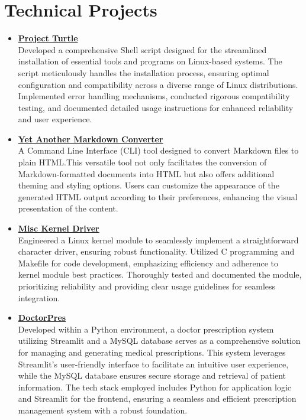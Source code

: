 \documentclass[a4paper,10pt]{article}
\begin{document}
\section*{Technical Projects}
\begin{itemize}[leftmargin=*]
   \item \textbf{\href{https://github.com/Adarsh-Liju/ProjectTurtle}{Project Turtle}} \\
        Developed a comprehensive Shell script designed for the streamlined installation of essential tools and programs on Linux-based systems. The script meticulously handles the installation process, ensuring optimal configuration and compatibility across a diverse range of Linux distributions. Implemented error handling mechanisms, conducted rigorous compatibility testing, and documented detailed usage instructions for enhanced reliability and user experience.
   \item \textbf{\href{https://github.com/Adarsh-Liju/yamc}{Yet Another Markdown Converter}} \\
        A Command Line Interface (CLI) tool designed to convert Markdown files to plain HTML.This versatile tool not only facilitates the conversion of Markdown-formatted documents into HTML but also offers additional theming and styling options. Users can customize the appearance of the generated HTML output according to their preferences, enhancing the visual presentation of the content.
   \item \textbf{\href{https://github.com/Adarsh-Liju/Misc-Kernel-Driver}{Misc Kernel Driver}} \\
        Engineered a Linux kernel module to seamlessly implement a straightforward character driver, ensuring robust functionality. Utilized C programming and Makefile for code development, emphasizing efficiency and adherence to kernel module best practices. Thoroughly tested and documented the module, prioritizing reliability and providing clear usage guidelines for seamless integration.
   \item \textbf{\href{https://github.com/Adarsh-Liju/DoctorPres}{DoctorPres}} \\
        Developed within a Python environment, a doctor prescription system utilizing Streamlit and a MySQL database serves as a comprehensive solution for managing and generating medical prescriptions. This system leverages Streamlit's user-friendly interface to facilitate an intuitive user experience, while the MySQL database ensures secure storage and retrieval of patient information. The tech stack employed includes Python for application logic and Streamlit for the frontend, ensuring a seamless and efficient prescription management system with a robust foundation.

\end{itemize}
\end{document}
